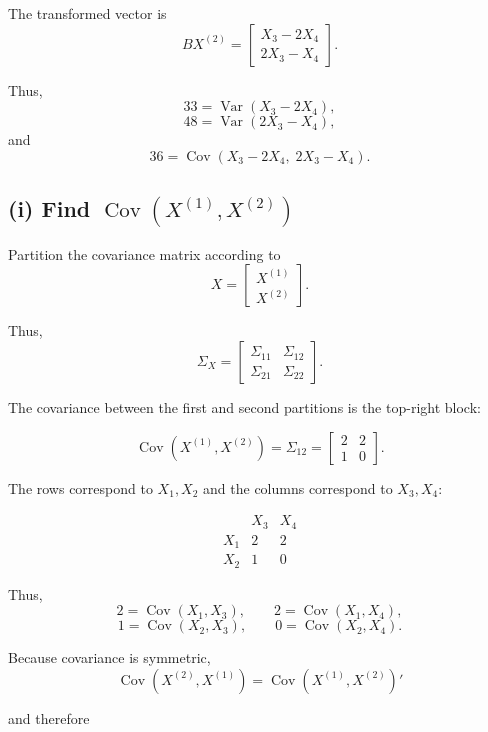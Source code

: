 \documentclass[12pt]{article}
\begin{document}
	The transformed vector is
	\[
	BX^{(2)}
	=
	\begin{bmatrix}
		X_3-2X_4\\
		2X_3-X_4
	\end{bmatrix}.
	\]
	
	Thus,
	\[
	33=\operatorname{Var}(X_3-2X_4),
	\]
	\[
	48=\operatorname{Var}(2X_3-X_4),
	\]
	and
	\[
	36=
	\operatorname{Cov}(X_3-2X_4,\;2X_3-X_4).
	\]
	
	\subsection*{(i) Find $\operatorname{Cov}(X^{(1)},X^{(2)})$}
	
	Partition the covariance matrix according to
	\[
	X=
	\begin{bmatrix}
		X^{(1)}\\
		X^{(2)}
	\end{bmatrix}.
	\]
	
	Thus,
	\[
	\Sigma_X
	=
	\begin{bmatrix}
		\Sigma_{11}&\Sigma_{12}\\
		\Sigma_{21}&\Sigma_{22}
	\end{bmatrix}.
	\]
	
	The covariance between the first and second partitions
	is the top-right block:
	
	\[
	\boxed{
		\operatorname{Cov}(X^{(1)},X^{(2)})
		=
		\Sigma_{12}
		=
		\begin{bmatrix}
			2&2\\
			1&0
		\end{bmatrix}
	}.
	\]
	
	The rows correspond to $X_1,X_2$ and the columns
	correspond to $X_3,X_4$:
	
	\[
	\begin{array}{c|cc}
		& X_3 & X_4\\
		\hline
		X_1 & 2 & 2\\
		X_2 & 1 & 0
	\end{array}
	\]
	
	Thus,
	\[
	2=\operatorname{Cov}(X_1,X_3),
	\qquad
	2=\operatorname{Cov}(X_1,X_4),
	\]
	\[
	1=\operatorname{Cov}(X_2,X_3),
	\qquad
	0=\operatorname{Cov}(X_2,X_4).
	\]
	
	Because covariance is symmetric,
	\[
	\boxed{
		\operatorname{Cov}(X^{(2)},X^{(1)})
		=
		\operatorname{Cov}(X^{(1)},X^{(2)})'
	}
	\]
	
	and therefore
	
\end{document}

